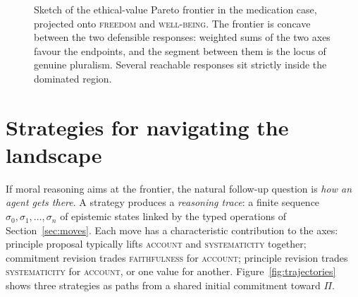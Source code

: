 \documentclass{article}
\begin{document}
\begin{figure}[!h]
  \centering
  \caption{Sketch of the ethical-value Pareto frontier in the medication
    case, projected onto \textsc{freedom} and \textsc{well-being}. The
    frontier is concave between the two defensible responses: weighted
    sums of the two axes favour the endpoints, and the segment between
    them is the locus of genuine pluralism. Several reachable responses
    sit strictly inside the dominated region.}
  \label{fig:medication}
\end{figure}


\section{Strategies for navigating the landscape}
\label{sec:strategies}

If moral reasoning aims at the frontier, the natural follow-up question is
\emph{how an agent gets there}. A strategy produces a \emph{reasoning
trace}: a finite sequence $\sigma_0, \sigma_1, \dots, \sigma_n$ of
epistemic states linked by the typed operations of
Section~\ref{sec:moves}. Each move has a characteristic contribution to
the axes: principle proposal typically lifts \textsc{account} and
\textsc{systematicity} together; commitment revision trades
\textsc{faithfulness} for \textsc{account}; principle revision trades
\textsc{systematicity} for \textsc{account}, or one value for another.
Figure~\ref{fig:trajectories} shows three strategies as paths from a
shared initial commitment toward $\Pi$.
\end{document}
